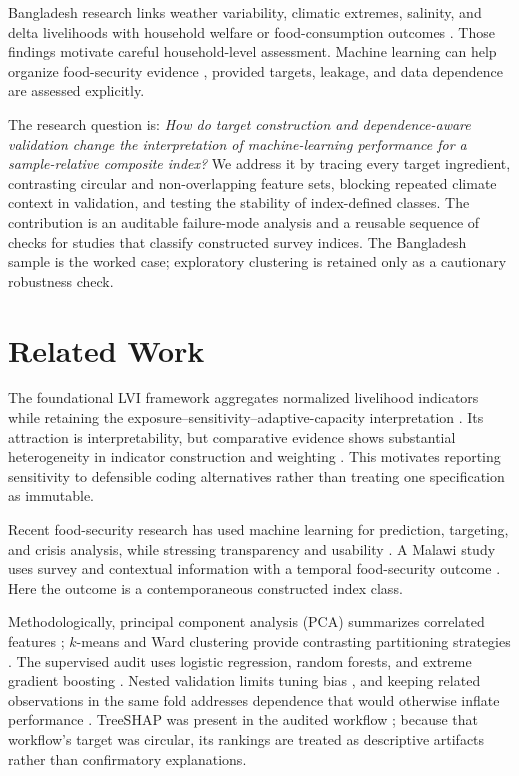 \documentclass[conference,a4paper]{IEEEtran}
\begin{document}
Bangladesh research links weather variability, climatic extremes, salinity, and delta livelihoods with household welfare or food-consumption outcomes \cite{matsuura2023weather,islam2022climate,lam2022salinity,islam2020beyond}. Those findings motivate careful household-level assessment. Machine learning can help organize food-security evidence \cite{zhou2022machine,martini2022machine}, provided targets, leakage, and data dependence are assessed explicitly.

The research question is: \emph{How do target construction and dependence-aware validation change the interpretation of machine-learning performance for a sample-relative composite index?} We address it by tracing every target ingredient, contrasting circular and non-overlapping feature sets, blocking repeated climate context in validation, and testing the stability of index-defined classes. The contribution is an auditable failure-mode analysis and a reusable sequence of checks for studies that classify constructed survey indices. The Bangladesh sample is the worked case; exploratory clustering is retained only as a cautionary robustness check.

\section{Related Work}
The foundational LVI framework aggregates normalized livelihood indicators while retaining the exposure--sensitivity--adaptive-capacity interpretation \cite{hahn2009lvi}. Its attraction is interpretability, but comparative evidence shows substantial heterogeneity in indicator construction and weighting \cite{zainab2024taking}. This motivates reporting sensitivity to defensible coding alternatives rather than treating one specification as immutable.

Recent food-security research has used machine learning for prediction, targeting, and crisis analysis, while stressing transparency and usability \cite{zhou2022machine,martini2022machine}. A Malawi study uses survey and contextual information with a temporal food-security outcome \cite{gholami2022food}. Here the outcome is a contemporaneous constructed index class.

Methodologically, principal component analysis (PCA) summarizes correlated features \cite{jolliffe2016pca}; $k$-means and Ward clustering provide contrasting partitioning strategies \cite{lloyd1982least,ward1963hierarchical}. The supervised audit uses logistic regression, random forests, and extreme gradient boosting \cite{cox1958regression,breiman2001random,chen2016xgboost}. Nested validation limits tuning bias \cite{varma2006bias}, and keeping related observations in the same fold addresses dependence that would otherwise inflate performance \cite{roberts2017cross}. TreeSHAP was present in the audited workflow \cite{lundberg2020local}; because that workflow's target was circular, its rankings are treated as descriptive artifacts rather than confirmatory explanations.
\end{document}
